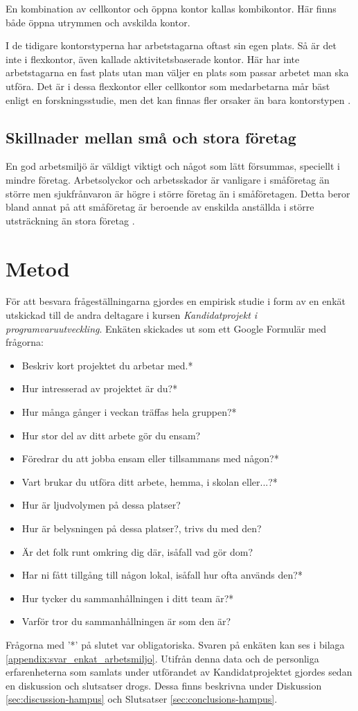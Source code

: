 En kombination av cellkontor och öppna kontor kallas kombikontor. Här finns både öppna utrymmen och avskilda kontor.

I de tidigare kontorstyperna har arbetstagarna oftast sin egen plats. Så är det inte i flexkontor, även kallade aktivitetsbaserade kontor. Här har inte arbetstagarna en fast plats utan man väljer en plats som passar arbetet man ska utföra. Det är i dessa flexkontor eller cellkontor som medarbetarna mår bäst enligt en forskningsstudie, men det kan finnas fler orsaker än bara kontorstypen \cite{AVKontor}.

\subsection{Skillnader mellan små och stora företag}
En god arbetsmiljö är väldigt viktigt och något som lätt försummas, speciellt i mindre företag. Arbetsolyckor och arbetsskador är vanligare i småföretag än större men sjukfrånvaron är högre i större företag än i småföretagen. Detta beror bland annat på att småföretag är beroende av enskilda anställda i större utsträckning än stora företag \cite{smaforetag}.


\section{Metod}
\label{sec:method-hampus}

För att besvara frågeställningarna gjordes en empirisk studie i form av en enkät utskickad till de andra deltagare i kursen \textit{Kandidatprojekt i programvaruutveckling}. Enkäten skickades ut som ett Google Formulär \cite{GForms} med frågorna:
\begin{itemize}
\item Beskriv kort projektet du arbetar med.*
\item Hur intresserad av projektet är du?*
\item Hur många gånger i veckan träffas hela gruppen?*
\item Hur stor del av ditt arbete gör du ensam?
\item Föredrar du att jobba ensam eller tillsammans med någon?*
\item Vart brukar du utföra ditt arbete, hemma, i skolan eller...?*
\item Hur är ljudvolymen på dessa platser?
\item Hur är belysningen på dessa platser?, trivs du med den?
\item Är det folk runt omkring dig där, isåfall vad gör dom?
\item Har ni fått tillgång till någon lokal, isåfall hur ofta används den?*
\item Hur tycker du sammanhållningen i ditt team är?*
\item Varför tror du sammanhållningen är som den är?
\end{itemize}
Frågorna med '*' på slutet var obligatoriska. Svaren på enkäten kan ses i bilaga \ref{appendix:svar_enkat_arbetsmiljo}. Utifrån denna data och de personliga erfarenheterna som samlats under utförandet av Kandidatprojektet gjordes sedan en diskussion och slutsatser drogs. Dessa finns beskrivna under Diskussion \ref{sec:discussion-hampus} och Slutsatser \ref{sec:conclusions-hampus}. 


